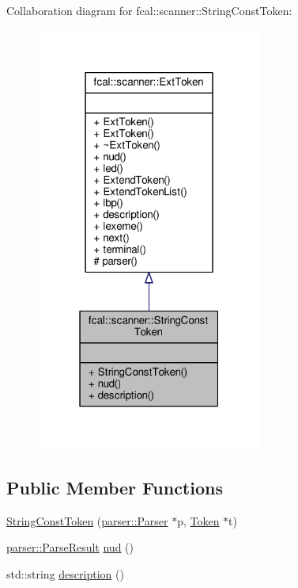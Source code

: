 Collaboration diagram for fcal\+:\+:scanner\+:\+:String\+Const\+Token\+:
\nopagebreak
\begin{figure}[H]
\begin{center}
\leavevmode
\includegraphics[width=211pt]{classfcal_1_1scanner_1_1StringConstToken__coll__graph}
\end{center}
\end{figure}
\subsection*{Public Member Functions}
\begin{DoxyCompactItemize}
\item 
\hyperlink{classfcal_1_1scanner_1_1StringConstToken_abdfef2a80a1b8c8546f053e0ca53efc9}{String\+Const\+Token} (\hyperlink{classfcal_1_1parser_1_1Parser}{parser\+::\+Parser} $\ast$p, \hyperlink{classfcal_1_1scanner_1_1Token}{Token} $\ast$t)
\item 
\hyperlink{classfcal_1_1parser_1_1ParseResult}{parser\+::\+Parse\+Result} \hyperlink{classfcal_1_1scanner_1_1StringConstToken_a974609417de4cb5876a6e57a22e254e9}{nud} ()
\item 
std\+::string \hyperlink{classfcal_1_1scanner_1_1StringConstToken_adf08f9d8df7c7a996d81bf8d8f0f5b07}{description} ()
\end{DoxyCompactItemize}
